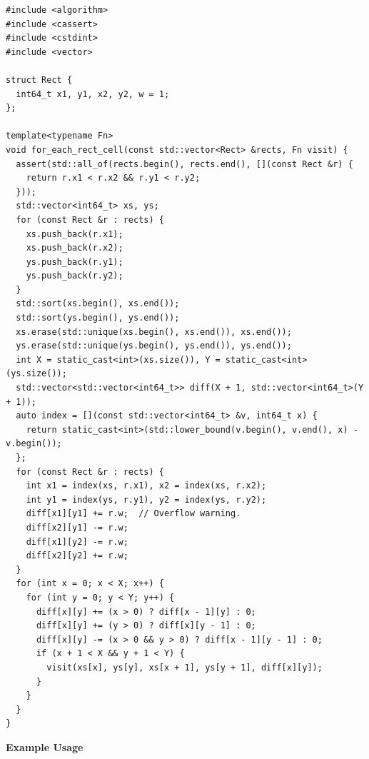 \begin{lstlisting}[style=cpp]
#include <algorithm>
#include <cassert>
#include <cstdint>
#include <vector>

struct Rect {
  int64_t x1, y1, x2, y2, w = 1;
};

template<typename Fn>
void for_each_rect_cell(const std::vector<Rect> &rects, Fn visit) {
  assert(std::all_of(rects.begin(), rects.end(), [](const Rect &r) {
    return r.x1 < r.x2 && r.y1 < r.y2;
  }));
  std::vector<int64_t> xs, ys;
  for (const Rect &r : rects) {
    xs.push_back(r.x1);
    xs.push_back(r.x2);
    ys.push_back(r.y1);
    ys.push_back(r.y2);
  }
  std::sort(xs.begin(), xs.end());
  std::sort(ys.begin(), ys.end());
  xs.erase(std::unique(xs.begin(), xs.end()), xs.end());
  ys.erase(std::unique(ys.begin(), ys.end()), ys.end());
  int X = static_cast<int>(xs.size()), Y = static_cast<int>(ys.size());
  std::vector<std::vector<int64_t>> diff(X + 1, std::vector<int64_t>(Y + 1));
  auto index = [](const std::vector<int64_t> &v, int64_t x) {
    return static_cast<int>(std::lower_bound(v.begin(), v.end(), x) - v.begin());
  };
  for (const Rect &r : rects) {
    int x1 = index(xs, r.x1), x2 = index(xs, r.x2);
    int y1 = index(ys, r.y1), y2 = index(ys, r.y2);
    diff[x1][y1] += r.w;  // Overflow warning.
    diff[x2][y1] -= r.w;
    diff[x1][y2] -= r.w;
    diff[x2][y2] += r.w;
  }
  for (int x = 0; x < X; x++) {
    for (int y = 0; y < Y; y++) {
      diff[x][y] += (x > 0) ? diff[x - 1][y] : 0;
      diff[x][y] += (y > 0) ? diff[x][y - 1] : 0;
      diff[x][y] -= (x > 0 && y > 0) ? diff[x - 1][y - 1] : 0;
      if (x + 1 < X && y + 1 < Y) {
        visit(xs[x], ys[y], xs[x + 1], ys[y + 1], diff[x][y]);
      }
    }
  }
}
\end{lstlisting}
\textbf{Example Usage}\par
